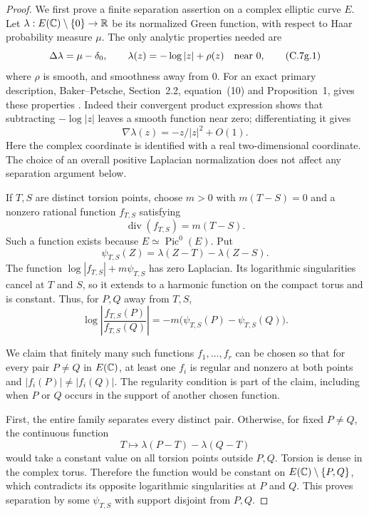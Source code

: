 \begin{proof}
We first prove a finite separation assertion on a complex elliptic
curve $E$. Let $\lambda:E(\mathbb C)\setminus\{0\}\to\mathbb R$ be its normalized
Green function, with respect to Haar probability measure $\mu$.
The only analytic properties needed are
\[
 \Delta\lambda=\mu-\delta_0,\qquad
 \lambda(z)=-\log|z|+\rho(z)\quad\hbox{near }0,               \tag{C.7g.1}
\]
where $\rho$ is smooth, and smoothness away from $0$.
For an exact primary description, Baker--Petsche, Section~2.2,
equation~(10) and Proposition~1, gives these properties
\cite[author pp.~5--6]{BC_BakerPetsche2005}.
Indeed their convergent product expression shows that subtracting
$-\log|z|$ leaves a smooth function near zero; differentiating it
gives
\[
              \nabla\lambda(z)=-z/|z|^2+O(1).              \tag{C.7g.2}
\]
Here the complex coordinate is identified with a real two-dimensional
coordinate. The choice of an overall positive Laplacian normalization
does not affect any separation argument below.

If $T,S$ are distinct torsion points, choose $m>0$ with
$m(T-S)=0$ and a nonzero rational function $f_{T,S}$ satisfying
\[
                         \operatorname{div}(f_{T,S})=m(T-S).
\]
Such a function exists because $E\simeq\operatorname{Pic}^0(E)$.
Put
\[
             \psi_{T,S}(Z)=\lambda(Z-T)-\lambda(Z-S).
\]
The function $\log|f_{T,S}|+m\psi_{T,S}$ has zero Laplacian.
Its logarithmic singularities cancel at $T$ and $S$, so it extends
to a harmonic function on the compact torus and is constant.
Thus, for $P,Q$ away from $T,S$,
\[
 \log\left|\frac{f_{T,S}(P)}{f_{T,S}(Q)}\right|
       =-m\bigl(\psi_{T,S}(P)-\psi_{T,S}(Q)\bigr).          \tag{C.7g.3}
\]

We claim that finitely many such functions $f_1,\ldots,f_r$ can
be chosen so that for every pair $P\ne Q$ in $E(\mathbb C)$, at least
one $f_i$ is regular and nonzero at both points and
$|f_i(P)|\ne|f_i(Q)|$. The regularity condition is part of the
claim, including when $P$ or $Q$ occurs in the support of another
chosen function.

First, the entire family separates every distinct pair. Otherwise,
for fixed $P\ne Q$, the continuous function
\[
             T\longmapsto\lambda(P-T)-\lambda(Q-T)
                                                               \tag{C.7g.4}
\]
would take a constant value on all torsion points outside $P,Q$.
Torsion is dense in the complex torus. Therefore the function would
be constant on $E(\mathbb C)\setminus\{P,Q\}$, which contradicts its
opposite logarithmic singularities at $P$ and $Q$. This proves
separation by some $\psi_{T,S}$ with support disjoint from $P,Q$.


\end{proof}
